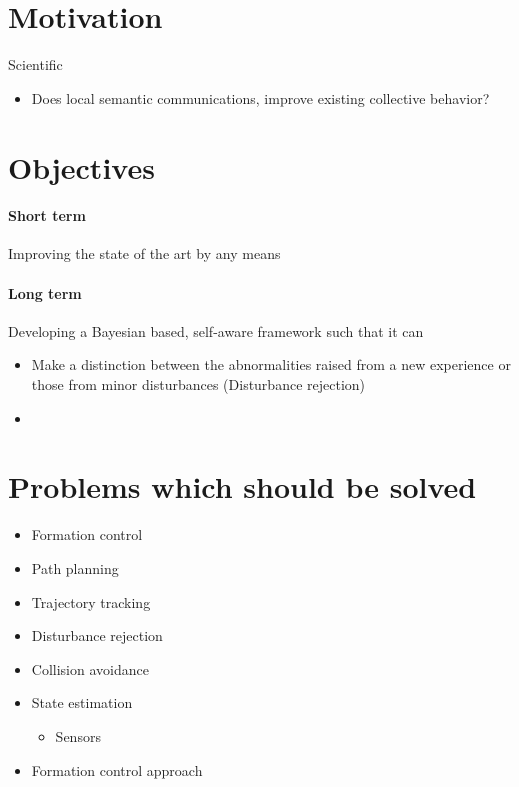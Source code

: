 \documentclass{article}
\begin{document}
	\section{Motivation}
		Scientific
		\begin{itemize}
			\item Does local semantic communications, improve existing collective behavior?
		\end{itemize}
	
	\section{Objectives}
		\paragraph{Short term}
			Improving the state of the art by any means
		\paragraph{Long term}
			Developing a Bayesian based, self-aware framework such that it  can
				\begin{itemize}
					\item Make a distinction between the abnormalities raised from a new experience or those from minor disturbances (Disturbance rejection)
					\item 
				\end{itemize}
			
	\section{Problems which should be solved}
		\begin{itemize}
			\item Formation control
			\item Path planning
			\item Trajectory tracking
			\item Disturbance rejection
			\item Collision avoidance
			\item State estimation
				\begin{itemize}
					\item Sensors
				\end{itemize}
			\item Formation control approach
		\end{itemize}
	
\end{document}
